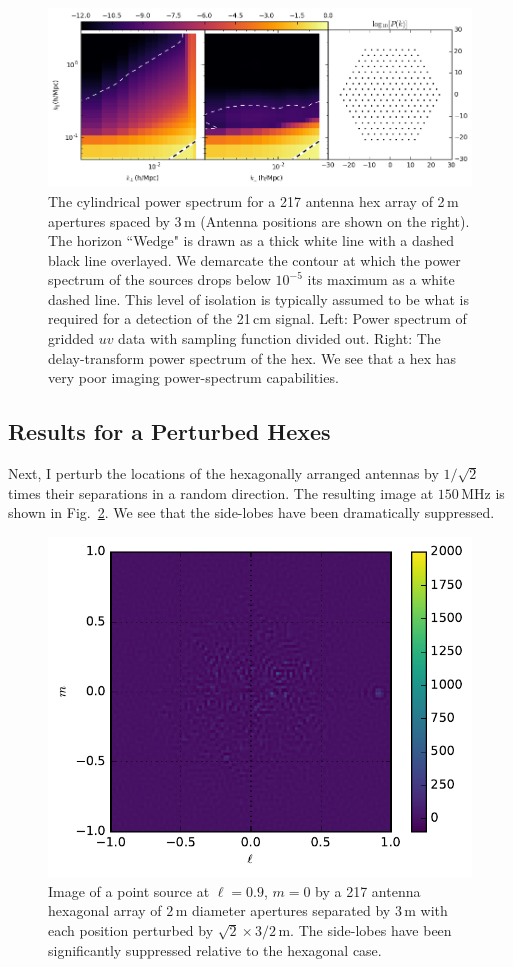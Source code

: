 \documentclass[a4paper,fleqn,usenatbib]{mnras}
\begin{document}
\begin{figure}
\includegraphics[width=\textwidth]{power_spectrum_hex_217_dAnt_2_dAntPos_3.png}
\caption{The cylindrical power spectrum for a 217 antenna hex array of 2\,m apertures spaced by 3\,m (Antenna positions are shown on the right). The horizon ``Wedge" is drawn as a thick white line with a dashed black line overlayed. We demarcate the contour at which the power spectrum of the sources drops below $10^{-5}$ its maximum as a white dashed line. This level of isolation is typically assumed to be what is required for a detection of the 21\,cm signal. Left: Power spectrum of gridded $uv$ data with sampling function divided out. Right: The delay-transform power spectrum of the hex. We see that a hex has very poor imaging power-spectrum capabilities.}
\label{fig:PowerSpectrumHexDefault}
\end{figure}

\subsection{Results for a Perturbed Hexes}
Next, I perturb the locations of the hexagonally arranged antennas by $1/\sqrt{2}$ times their separations in a random direction. The resulting image at $150$\,MHz is shown in Fig.~\ref{fig:ImageHexPerturbedDefault}. We see that the side-lobes have been dramatically suppressed. 
\begin{figure}
\includegraphics[width=.5\textwidth]{image_offZenith_217Ant_pHex_1config_dant_2_dantpos_3.pdf}
\caption{Image of a point source at $\ell=0.9$, $m=0$ by a 217 antenna hexagonal array of $2$\,m diameter apertures separated by $3$\,m with each position perturbed by $\sqrt{2}\times 3/2$\,m. The side-lobes have been significantly suppressed relative to the hexagonal case.}
\label{fig:ImageHexPerturbedDefault}
\end{figure}
\end{document}
